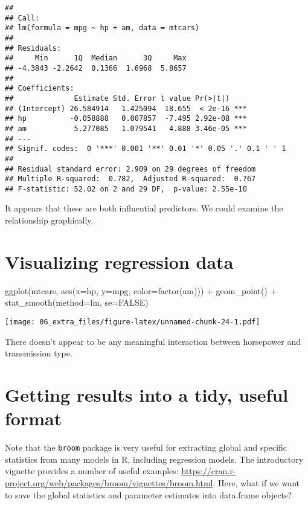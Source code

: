 \documentclass[
]{book}
\newenvironment{Shaded}{\begin{snugshade}}{\end{snugshade}}
\newcommand{\AttributeTok}[1]{\textcolor[rgb]{0.77,0.63,0.00}{#1}}
\newcommand{\ConstantTok}[1]{\textcolor[rgb]{0.00,0.00,0.00}{#1}}
\newcommand{\FunctionTok}[1]{\textcolor[rgb]{0.00,0.00,0.00}{#1}}
\newcommand{\NormalTok}[1]{#1}
\newcommand{\SpecialCharTok}[1]{\textcolor[rgb]{0.00,0.00,0.00}{#1}}
\begin{document}
\begin{verbatim}
## 
## Call:
## lm(formula = mpg ~ hp + am, data = mtcars)
## 
## Residuals:
##     Min      1Q  Median      3Q     Max 
## -4.3843 -2.2642  0.1366  1.6968  5.8657 
## 
## Coefficients:
##              Estimate Std. Error t value Pr(>|t|)    
## (Intercept) 26.584914   1.425094  18.655  < 2e-16 ***
## hp          -0.058888   0.007857  -7.495 2.92e-08 ***
## am           5.277085   1.079541   4.888 3.46e-05 ***
## ---
## Signif. codes:  0 '***' 0.001 '**' 0.01 '*' 0.05 '.' 0.1 ' ' 1
## 
## Residual standard error: 2.909 on 29 degrees of freedom
## Multiple R-squared:  0.782,  Adjusted R-squared:  0.767 
## F-statistic: 52.02 on 2 and 29 DF,  p-value: 2.55e-10
\end{verbatim}

It appears that these are both influential predictors. We could examine the relationship graphically.

\hypertarget{visualizing-regression-data}{%
\section{Visualizing regression data}\label{visualizing-regression-data}}

\begin{Shaded}
\begin{Highlighting}[]
\FunctionTok{ggplot}\NormalTok{(mtcars, }\FunctionTok{aes}\NormalTok{(}\AttributeTok{x=}\NormalTok{hp, }\AttributeTok{y=}\NormalTok{mpg, }\AttributeTok{color=}\FunctionTok{factor}\NormalTok{(am))) }\SpecialCharTok{+} \FunctionTok{geom\_point}\NormalTok{() }\SpecialCharTok{+} 
  \FunctionTok{stat\_smooth}\NormalTok{(}\AttributeTok{method=}\NormalTok{lm, }\AttributeTok{se=}\ConstantTok{FALSE}\NormalTok{)}
\end{Highlighting}
\end{Shaded}

\texttt{[image: 06\_extra\_files/figure-latex/unnamed-chunk-24-1.pdf]}

There doesn't appear to be any meaningful interaction between horsepower and transmission type.

\hypertarget{getting-results-into-a-tidy-useful-format}{%
\section{Getting results into a tidy, useful format}\label{getting-results-into-a-tidy-useful-format}}

Note that the \texttt{broom} package is very useful for extracting global and specific statistics from many models in R, including regression models. The introductory vignette provides a number of useful examples: \url{https://cran.r-project.org/web/packages/broom/vignettes/broom.html}. Here, what if we want to save the global statistics and parameter estimates into data.frame objects?
\end{document}
